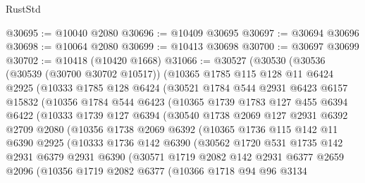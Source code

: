 \begin{lexlean}{RustStd}
\begin{coremodule}
@30695 := @10040 @2080
@30696 := @10409 @30695
@30697 := @30694 @30696
@30698 := @10064 @2080
@30699 := @10413 @30698
@30700 := @30697 @30699
@30702 := @10418 (@10420 @1668)
@31066 := @30527
    (@30530
      (@30536
        (@30539 (@30700 @30702 @10517))
        (@10365
          @1785
          @115
          @128
          @11
          @6424
          @2925
          (@10333
            @1785
            @128
            @6424
            (@30521
              @1784
              @544
              @2931
              @6423
              @6157
              @15832
              (@10356
                @1784
                @544
                @6423
                (@10365
                  @1739
                  @1783
                  @127
                  @455
                  @6394
                  @6422
                  (@10333
                    @1739
                    @127
                    @6394
                    (@30540
                      @1738
                      @2069
                      @127
                      @2931
                      @6392
                      @2709
                      @2080
                      (@10356
                        @1738
                        @2069
                        @6392
                        (@10365
                          @1736
                          @115
                          @142
                          @11
                          @6390
                          @2925
                          (@10333
                            @1736
                            @142
                            @6390
                            (@30562
                              @1720
                              @531
                              @1735
                              @142
                              @2931
                              @6379
                              @2931
                              @6390
                              (@30571
                                @1719
                                @2082
                                @142
                                @2931
                                @6377
                                @2659
                                @2096
                                (@10356
                                  @1719
                                  @2082
                                  @6377
                                  (@10366
                                    @1718
                                    @94
                                    @96
                                    @3134

\end{coremodule}
\end{lexlean}

